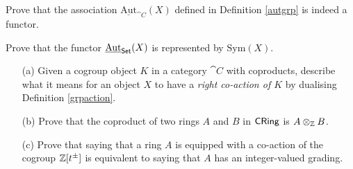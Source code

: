 \vspace*{0.1in}

\begin{problem}\label{prob B.6}
Prove that the association $\underline{\mathrm{Aut}}_{\cat{C}}(X)$ defined in Definition \ref{autgrp} is indeed a functor.
\end{problem}

\vspace*{0.1in}

\begin{problem}\label{prob B.7}
Prove that the functor $\underline{\mathrm{Aut}}_{\mathsf{Set}}(X)$ is represented by $\mathrm{Sym}(X)$.
\end{problem}

\vspace*{0.1in}

\begin{problem}\label{prob B.8}\hfill
\begin{itemize}
\item[(a)] Given a cogroup object $K$ in a category $\cat{C}$ with coproducts, describe what it means for an object $X$ to have a \emph{right co-action of $K$} by dualising Definition \ref{grpaction}.
\item[(b)] Prove that the coproduct of two rings $A$ and $B$ in $\mathsf{CRing}$ is $A \otimes_\mathbb Z B$.
\item[(c)] Prove that saying that a ring $A$ is equipped with a co-action of the cogroup $\mathbb Z[t^{\pm}]$ is equivalent to saying that $A$ has an integer-valued grading.
\end{itemize}
\end{problem}